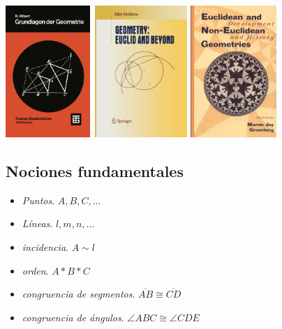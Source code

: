\documentclass[t, aspectratio=169]{beamer}
\begin{document}
\begin{frame}[fragile, c]
	\centerline{
		\includegraphics[height=5cm]{./imgs/Hilbert_portada.png}\,
		\pause
		\includegraphics[height=5cm]{./imgs/Hartshorne_portada.png}
		\includegraphics[height=5cm]{./imgs/Greenberg_portada.png}\,
	}
\end{frame}

\subsection{Nociones fundamentales}

\begin{frame}[fragile, c]
	\begin{itemize}
		\item \textit{Puntos}. $A, B, C, \dots$
		\item \textit{Líneas}. $l, m, n, \dots$
		      \pause
		\item \textit{incidencia}. $A\sim l$
		\item \textit{orden}. $A * B * C$
		\item \textit{congruencia de segmentos}. $\overline{AB}\cong\overline{CD}$
		\item \textit{congruencia de ángulos}. $\angle ABC \cong\angle CDE$
	\end{itemize}
\end{frame}
\end{document}
